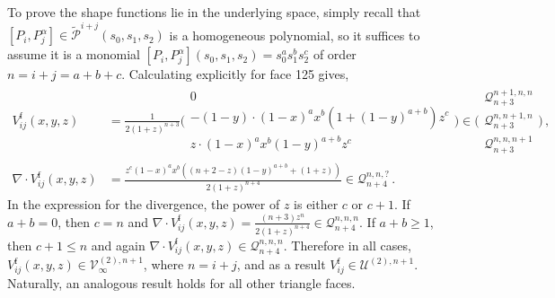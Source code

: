 To prove the shape functions lie in the underlying space, simply recall that $[P_i,P_j^\alpha]\in\tilde{\mathcal{P}}^{i+j}(s_0,s_1,s_2)$ is a homogeneous polynomial, so it suffices to assume it is a monomial $[P_i,P_j^\alpha](s_0,s_1,s_2)=s_0^as_1^bs_2^c$ of order $n=i+j=a+b+c$.
Calculating explicitly for face 125 gives,
\begin{equation}
	\begin{aligned}
		V_{ij}^\mathrm{f}(x,y,z)&=\textstyle{\frac{1}{2(1+z)^{n+3}}}
			\bigg(\begin{smallmatrix}0\\[2pt]-(1-y)\cdot(1-x)^ax^b(1+(1-y)^{a+b})z^c\\[2pt]
				z\cdot(1-x)^ax^b(1-y)^{a+b}z^c\end{smallmatrix}\bigg)
					\in\Bigg(\begin{smallmatrix}\mathcal{Q}_{n+3}^{n+1,n,n}\\[2pt]\mathcal{Q}_{n+3}^{n,n+1,n}\\[2pt]
						\mathcal{Q}_{n+3}^{n,n,n+1}\end{smallmatrix}\Bigg)\,,\\
		\nabla\!\cdot\!V_{ij}^\mathrm{f}(x,y,z)&=\displaystyle{\frac{z^c(1-x)^ax^b((n+2-z)(1-y)^{a+b}+(1+z))}{2(1+z)^{n+4}}}
			\in\mathcal{Q}_{n+4}^{n,n,?}\,.
	\end{aligned}
\end{equation}
In the expression for the divergence, the power of $z$ is either $c$ or $c+1$.
If $a+b=0$, then $c=n$ and $\nabla\!\cdot\!V_{ij}^\mathrm{f}(x,y,z)=\frac{(n+3)z^n}{2(1+z)^{n+4}}\in\mathcal{Q}_{n+4}^{n,n,n}$.
If $a+b\geq1$, then $c+1\leq n$ and again $\nabla\!\cdot\!V_{ij}^\mathrm{f}(x,y,z)\in\mathcal{Q}_{n+4}^{n,n,n}$.
Therefore in all cases, $V_{ij}^\mathrm{f}(x,y,z)\in\mathcal{V}_\infty^{(2),n+1}$, where $n=i+j$, and as a result $V_{ij}^\mathrm{f}\in\mathcal{U}^{(2),n+1}$.
Naturally, an analogous result holds for all other triangle faces.

